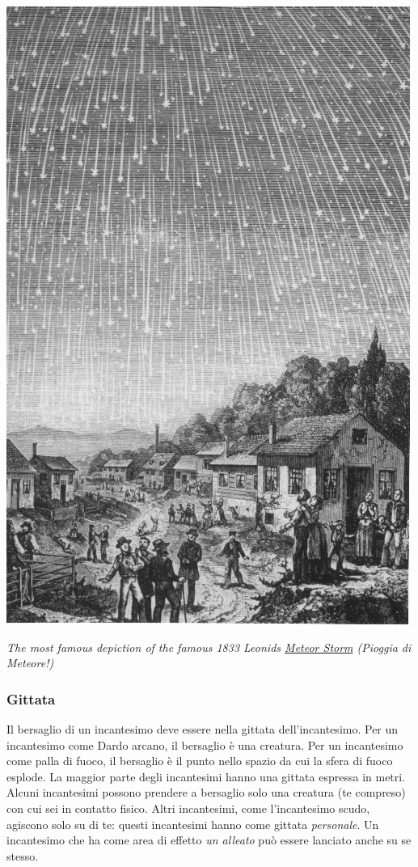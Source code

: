 \begin{multicols}{2}
\begin{itemize}[leftmargin=*]
\end{itemize}



\begin{center}
	\includegraphics[width=0.7\linewidth]{immagini/Leonids-1833.png}
	
	\emph{The most famous depiction of the famous 1833 Leonids \hyperlink{sciamedimeteore}{Meteor Storm} (Pioggia di Meteore!)}
\end{center}

\subsubsection{Gittata}\label{magiegittata}

Il bersaglio di un incantesimo deve essere nella gittata dell'incantesimo. Per un incantesimo come Dardo arcano, il bersaglio è una creatura. Per un incantesimo come palla di fuoco, il bersaglio è il punto nello spazio da cui la sfera di fuoco esplode. La maggior parte degli incantesimi hanno una gittata espressa in metri. Alcuni incantesimi possono prendere a bersaglio solo una creatura (te compreso) con cui sei in contatto fisico. Altri incantesimi, come l'incantesimo scudo, agiscono solo su di te: questi incantesimi hanno come gittata \emph{personale}. Un incantesimo che ha come area di effetto \emph{un alleato} può essere lanciato anche su se stesso.


\end{multicols}
